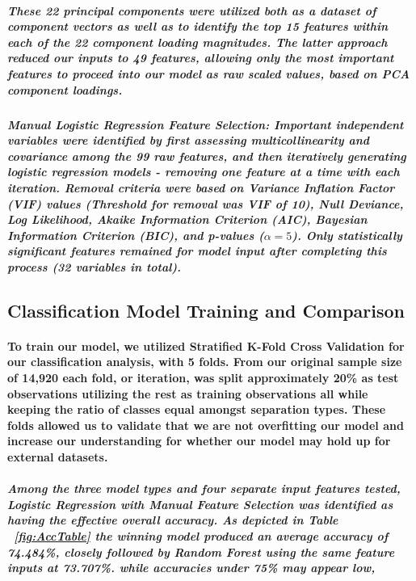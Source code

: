 \documentclass{article}
\begin{document}
\subparagraph{These 22 principal components were utilized both as a dataset of component vectors as well as to identify the top 15 features within each of the 22 component loading magnitudes. The latter approach reduced our inputs to 49 features, allowing only the most important features to proceed into our model as raw scaled values, based on PCA component loadings.}

\subparagraph{Manual Logistic Regression Feature Selection: Important independent variables were identified by first assessing multicollinearity and covariance among the 99 raw features, and then iteratively generating logistic regression models - removing one feature at a time with each iteration. Removal criteria were based on Variance Inflation Factor (VIF) values (Threshold for removal was VIF of 10), Null Deviance, Log Likelihood, Akaike Information Criterion (AIC), Bayesian Information Criterion (BIC), and p-values ($\alpha = 5$). Only statistically significant features remained for model input after completing this process (32 variables in total).}
 

\subsection{Classification Model Training and Comparison}

\paragraph{To train our model, we utilized Stratified K-Fold Cross Validation for our classification analysis, with 5 folds. From our original sample size of 14,920 each fold, or iteration, was split approximately 20\% as test observations utilizing the rest as training observations all while keeping the ratio of classes equal amongst separation types. These folds allowed us to validate that we are not overfitting our model and increase our understanding for whether our model may hold up for external datasets.}

\subparagraph{Among the three model types and four separate input features tested, Logistic Regression with Manual Feature Selection was identified as having the effective overall accuracy. As depicted in Table ~\ref{fig:AccTable} the winning model produced an average accuracy of 74.484\%, closely followed by Random Forest using the same feature inputs at 73.707\%. while accuracies under 75\% may appear low, } 
\end{document}
